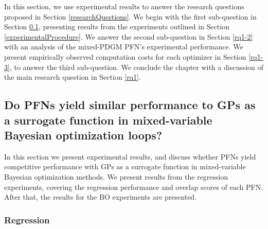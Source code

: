 \documentclass[12pt,twoside]{reedthesis}
\begin{document}
In this section, we use experimental results to answer the research questions proposed in Section \ref{researchQuestions}. We begin with the first sub-question in Section \ref{rq1-1}, presenting results from the experiments outlined in Section \ref{experimentalProcedure}. We answer the second sub-question in Section \ref{rq1-2} with an analysis of the mixed-PDGM PFN's experimental performance. We present empirically observed computation costs for each optimizer in Section \ref{rq1-3}, to answer the third sub-question. We conclude the chapter with a discussion of the main research question in Section \ref{rq1}.

\hypertarget{rq1-1}{%
\subsection{Do PFNs yield similar performance to GPs as a surrogate function in mixed-variable Bayesian optimization loops?}\label{rq1-1}}

In this section we present experimental results, and discuss whether PFNs yield competitive performance with GPs as a surrogate function in mixed-variable Bayesian optimization methods. We present results from the regression experiments, covering the regression performance and overlap scores of each PFN. After that, the results for the BO experiments are presented.

\hypertarget{regression}{%
\subsubsection{Regression}\label{regression}}
\end{document}
